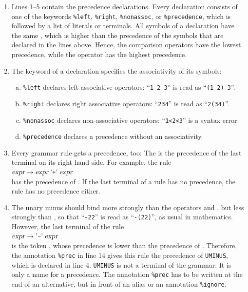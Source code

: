 \begin{enumerate}
\item Lines 1--5 contain the precedence declarations.  Every declaration consists of one of the keywords
      \texttt{\%left}, \texttt{\%right}, \texttt{\%nonassoc}, or \texttt{\%precedence}, which is followed by a list
      of literals or terminals.  All symbols of a declaration have the same
      , which is higher than the precedence of the symbols that are
      declared in the lines above.  Hence, the comparison operators have the lowest precedence, while the operator
       has the highest precedence.
\item The keyword of a declaration specifies the associativity of its symbols:
      \begin{enumerate}[(a)]
      \item \texttt{\%left} declares left associative operators:  ``\texttt{1-2-3}'' is read as
            ``\texttt{(1-2)-3}''.
      \item \texttt{\%right} declares right associative operators:  ``\texttt{234}'' is read
            as ``\texttt{2(34)}''.
      \item \texttt{\%nonassoc} declares non-associative operators:  ``\texttt{1<2<3}'' is a syntax error.
      \item \texttt{\%precedence} declares a precedence without an associativity.
      \end{enumerate}
\item Every grammar rule gets a precedence, too:  The  is the precedence of the last terminal on its right hand side.  For example, the rule
      \\[0.2cm]
      \hspace*{1.3cm}
      $\textsl{expr} \rightarrow \textsl{expr} \;\mbox{'\texttt{+}'}\; \textsl{expr}$
      \\[0.2cm]
      has the precedence of \saquoted{+}.  If the last terminal of a rule has no precedence, the rule has no
      precedence either.
\item The unary minus should bind more strongly than the operators \saquoted{*} and \saquoted{/}, but less
      strongly than , so that ``\texttt{-22}'' is read as
      ``\texttt{-(22)}'', as usual in mathematics.  However, the last terminal of the rule
      \\[0.2cm]
      \hspace*{1.3cm}
      $\textsl{expr} \rightarrow \mbox{'\texttt{-}'}\; \textsl{expr}$
      \\[0.2cm]
      is the token \saquoted{-}, whose precedence is lower than the precedence of \saquoted{*}.  Therefore, the
      annotation \texttt{\%prec} in line 14 gives this rule the precedence of \texttt{UMINUS}, which is declared
      in line 4.  \texttt{UMINUS} is not a terminal of the grammar:  It is only a name for a precedence.  The
      annotation \texttt{\%prec} has to be written at the end of an alternative, but in front of an alias or an
      annotation \texttt{\%ignore}.
\end{enumerate}

